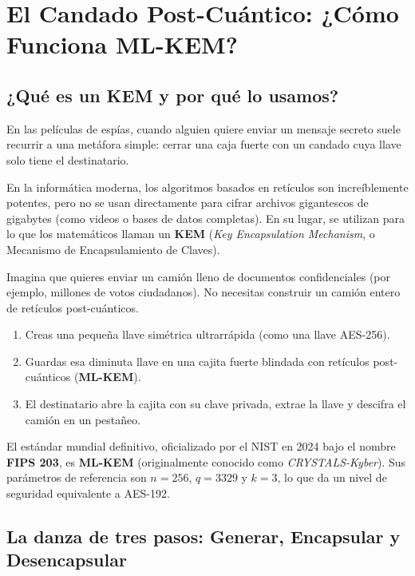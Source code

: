 \chapter{El Candado Post-Cuántico: ¿Cómo Funciona ML-KEM?}
\label{cap:mlkem_candado}

\section{¿Qué es un KEM y por qué lo usamos?}

En las películas de espías, cuando alguien quiere enviar un mensaje secreto suele recurrir a una metáfora simple: cerrar una caja fuerte con un candado cuya llave solo tiene el destinatario.

En la informática moderna, los algoritmos basados en retículos son increíblemente potentes, pero no se usan directamente para cifrar archivos gigantescos de gigabytes (como videos o bases de datos completas). En su lugar, se utilizan para lo que los matemáticos llaman un \textbf{KEM} (\textit{Key Encapsulation Mechanism}, o Mecanismo de Encapsulamiento de Claves).

\begin{metafora}
Imagina que quieres enviar un camión lleno de documentos confidenciales (por ejemplo, millones de votos ciudadanos). No necesitas construir un camión entero de retículos post-cuánticos.
\begin{enumerate}
  \item Creas una pequeña llave simétrica ultrarrápida (como una llave AES-256).
  \item Guardas esa diminuta llave en una cajita fuerte blindada con retículos post-cuánticos (\textbf{ML-KEM}).
  \item El destinatario abre la cajita con su clave privada, extrae la llave y descifra el camión en un pestañeo.
\end{enumerate}
\end{metafora}

El estándar mundial definitivo, oficializado por el NIST en 2024 bajo el nombre \textbf{FIPS 203}, es \textbf{ML-KEM} (originalmente conocido como \textit{CRYSTALS-Kyber}). Sus parámetros de referencia son $n=256$, $q=3329$ y $k=3$, lo que da un nivel de seguridad equivalente a AES-192.

\section{La danza de tres pasos: Generar, Encapsular y Desencapsular}

